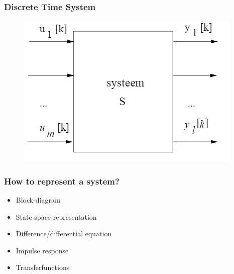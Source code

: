 \begin{frame}
	\frametitle{Discrete Time System}
		\begin{example}
			\begin{figure}
			\centering
			\includegraphics[height=0.7\textheight]{Images/discrete_time_systems_14}

			\label{fig:discrete_time_systems_14}
		\end{figure}

		\end{example}
\end{frame}
\begin{frame}
	\frametitle{How to represent a system?}
	\begin{itemize}
		\item<1-> Block-diagram
		\item<2-> State space representation
		\item<3-> Difference/differential equation
		\item<4-> Impulse response
		\item<5-> Transferfunctions
	\end{itemize}

\end{frame}
